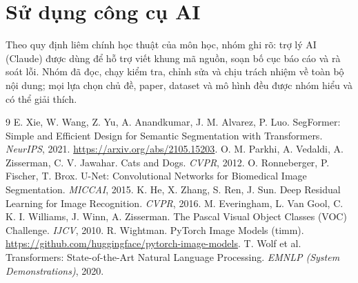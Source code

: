 \documentclass[12pt]{article}
\begin{document}
\section{Sử dụng công cụ AI}
Theo quy định liêm chính học thuật của môn học, nhóm ghi rõ: trợ lý AI (Claude) được dùng để hỗ trợ viết khung mã nguồn,
soạn bố cục báo cáo và rà soát lỗi. Nhóm đã đọc, chạy kiểm tra, chỉnh sửa và chịu trách nhiệm về toàn bộ nội dung;
mọi lựa chọn chủ đề, paper, dataset và mô hình đều được nhóm hiểu và có thể giải thích.

\begin{thebibliography}{9}
 E. Xie, W. Wang, Z. Yu, A. Anandkumar, J. M. Alvarez, P. Luo. SegFormer: Simple and Efficient Design for Semantic Segmentation with Transformers. \emph{NeurIPS}, 2021. \url{https://arxiv.org/abs/2105.15203}.
 O. M. Parkhi, A. Vedaldi, A. Zisserman, C. V. Jawahar. Cats and Dogs. \emph{CVPR}, 2012.
 O. Ronneberger, P. Fischer, T. Brox. U-Net: Convolutional Networks for Biomedical Image Segmentation. \emph{MICCAI}, 2015.
 K. He, X. Zhang, S. Ren, J. Sun. Deep Residual Learning for Image Recognition. \emph{CVPR}, 2016.
 M. Everingham, L. Van Gool, C. K. I. Williams, J. Winn, A. Zisserman. The Pascal Visual Object Classes (VOC) Challenge. \emph{IJCV}, 2010.
 R. Wightman. PyTorch Image Models (timm). \url{https://github.com/huggingface/pytorch-image-models}.
 T. Wolf et al. Transformers: State-of-the-Art Natural Language Processing. \emph{EMNLP (System Demonstrations)}, 2020.
\end{thebibliography}
\end{document}
